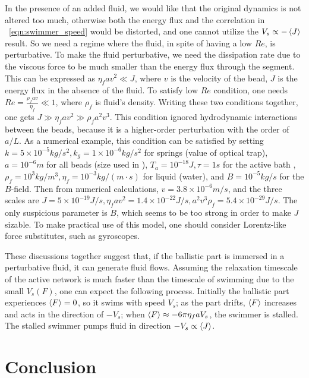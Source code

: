 \documentclass[
 preprint,
 preprintnumbers,
 amsmath,amssymb,
 aps,
 pre,
 longbibliography,
 superscriptaddress,
 10pt, twocolumn
]{revtex4-1}
\begin{document}
In the presence of an added fluid, we would like that the original dynamics is not altered too much, otherwise both the energy flux and the correlation in \eqnname~\eqref{eqn:swimmer_speed} would be distorted, and one cannot utilize the $V_s \propto -\expval{J}$ result.
So we need a regime where the fluid, in spite of having a low $Re$, is perturbative.
To make the fluid perturbative, we need the dissipation rate due to the viscous force to be much smaller than the energy flux through the segment. This can be expressed as $\eta_f a v^2 \ll J$, where $v$ is the velocity of the bead, $J$ is the energy flux in the absence of the fluid.
To satisfy low $Re$ condition, one needs $Re = \frac{\rho_f a v}{\eta_f} \ll 1$, where $\rho_f$ is fluid's density.
Writing these two conditions together, one gets $J \gg \eta_f a v^2 \gg \rho_f a^2 v^3$.
This condition ignored hydrodynamic interactions between the beads, because it is a higher-order perturbation with the order of $a/L$.
As a numerical example, this condition can be satisfied by setting $k=5\times 10^{-5} kg/s^2, k_g=1\times 10^{-6} kg/s^2$ for springs (value of optical trap), $a=10^{-6}m$ for all beads (size used in \cite{Leoni2009BasicSwimmer}), $T_a=10^{-18} J, \tau=1s$ for the active bath \cite{Wu2000ParticleDiffusion}, $\rho_f=10^3kg/m^3, \eta_f=10^{-3}kg/(m\cdot s)$ for liquid (water), and $B=10^{-5} kg/s$ for the $B$-field.
Then from numerical calculations, $v=3.8\times 10^{-6}m/s$, and the three scales are $J=5\times 10^{-19}J/s, \eta_f av^2=1.4\times 10^{-22}J/s, a^2v^3\rho_f=5.4\times 10^{-29}J/s$.
The only suspicious parameter is $B$, which seems to be too strong in order to make $J$ sizable. To make practical use of this model, one should consider Lorentz-like force substitutes, such as gyroscopes.

These discussions together suggest that, if the ballistic part is immersed in a perturbative fluid, it can generate fluid flows.
Assuming the relaxation timescale of the active network is much faster than the timescale of swimming due to the small $V_s(F)$, one can expect the following process. Initially the ballistic part experiences $\expval{F}=0$, so it swims with speed $V_s$; as the part drifts, $\expval{F}$ increases and acts in the direction of $-V_s$; when $\expval{F} \approx -6\pi\eta_f a V_s$, the swimmer is stalled. The stalled swimmer pumps fluid in direction $-V_s \propto \expval{J}$.


\section{Conclusion} \label{sec:conclusion}
\end{document}
